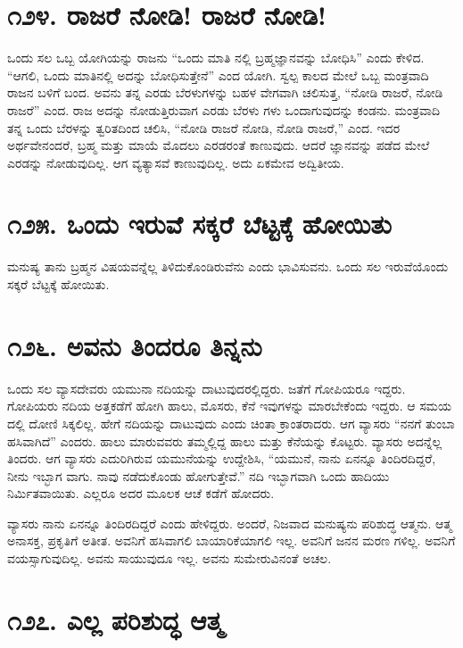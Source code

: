 \section{\num{೧೨೪. } ರಾಜರೆ ನೋಡಿ! ರಾಜರೆ ನೋಡಿ!}

ಒಂದು ಸಲ ಒಬ್ಬ ಯೋಗಿಯನ್ನು ರಾಜನು “ಒಂದು ಮಾತಿ ನಲ್ಲಿ ಬ್ರಹ್ಮಜ್ಞಾನವನ್ನು ಬೋಧಿಸಿ” ಎಂದು ಕೇಳಿದ. “ಆಗಲಿ, ಒಂದು ಮಾತಿನಲ್ಲಿ ಅದನ್ನು ಬೋಧಿಸುತ್ತೇನೆ” ಎಂದ ಯೋಗಿ. ಸ್ವಲ್ಪ ಕಾಲದ ಮೇಲೆ ಒಬ್ಬ ಮಂತ್ರವಾದಿ ರಾಜನ ಬಳಿಗೆ ಬಂದ. ಅವನು ತನ್ನ ಎರಡು ಬೆರಳುಗಳನ್ನು ಬಹಳ ವೇಗವಾಗಿ ಚಲಿಸುತ್ತ, “ನೋಡಿ ರಾಜರೆ, ನೋಡಿ ರಾಜರೆ” ಎಂದ. ರಾಜ ಅದನ್ನು ನೋಡುತ್ತಿರುವಾಗ ಎರಡು ಬೆರಳು ಗಳು ಒಂದಾಗುವುದನ್ನು ಕಂಡನು. ಮಂತ್ರವಾದಿ ತನ್ನ ಒಂದು ಬೆರಳನ್ನು ತ್ವರಿತದಿಂದ ಚಲಿಸಿ, “ನೋಡಿ ರಾಜರೆ ನೋಡಿ, ನೋಡಿ ರಾಜರೆ,” ಎಂದ. ಇದರ ಅರ್ಥವೇನಂದರೆ, ಬ್ರಹ್ಮ ಮತ್ತು ಮಾಯೆ ಮೊದಲು ಎರಡರಂತೆ ಕಾಣುವುದು. ಆದರೆ ಜ್ಞಾನವನ್ನು ಪಡೆದ ಮೇಲೆ ಎರಡನ್ನು ನೋಡುವುದಿಲ್ಲ. ಆಗ ವ್ಯತ್ಯಾಸವೆ ಕಾಣುವುದಿಲ್ಲ. ಅದು ಏಕಮೇವ ಅದ್ವಿತೀಯ.


\section{\num{೧೨೫. } ಒಂದು ಇರುವೆ ಸಕ್ಕರೆ ಬೆಟ್ಟಕ್ಕೆ ಹೋಯಿತು}

ಮನುಷ್ಯ ತಾನು ಬ್ರಹ್ಮನ ವಿಷಯವನ್ನೆಲ್ಲ ತಿಳಿದುಕೊಂಡಿರುವೆನು ಎಂದು ಭಾವಿಸುವನು. ಒಂದು ಸಲ ಇರುವೆಯೊಂದು ಸಕ್ಕರೆ ಬೆಟ್ಟಕ್ಕೆ ಹೋಯಿತು.



\section{\num{೧೨೬. } ಅವನು ತಿಂದರೂ ತಿನ್ನನು}

ಒಂದು ಸಲ ವ್ಯಾಸದೇವರು ಯಮುನಾ ನದಿಯನ್ನು ದಾಟುವುದರಲ್ಲಿದ್ದರು. ಜತೆಗೆ ಗೋಪಿಯರೂ ಇದ್ದರು. ಗೋಪಿಯರು ನದಿಯ ಅತ್ತಕಡೆಗೆ ಹೋಗಿ ಹಾಲು, ಮೊಸರು, ಕೆನೆ ಇವುಗಳನ್ನು ಮಾರಬೇಕೆಂದು ಇದ್ದರು. ಆ ಸಮಯ ದಲ್ಲಿ ದೋಣಿ ಸಿಕ್ಕಲಿಲ್ಲ. ಹೇಗೆ ನದಿಯನ್ನು ದಾಟುವುದು ಎಂದು ಚಿಂತಾ ಕ್ರಾಂತರಾದರು. ಆಗ ವ್ಯಾಸರು “ನನಗೆ ತುಂಬಾ ಹಸಿವಾಗಿದೆ” ಎಂದರು. ಹಾಲು ಮಾರುವವರು ತಮ್ಮಲ್ಲಿದ್ದ ಹಾಲು ಮತ್ತು ಕೆನೆಯನ್ನು ಕೊಟ್ಟರು. ವ್ಯಾಸರು ಅದನ್ನೆಲ್ಲ ತಿಂದರು. ಆಗ ವ್ಯಾಸರು ಎದುರಿಗಿರುವ ಯಮುನೆಯನ್ನು ಉದ್ದೇಶಿಸಿ, “ಯಮುನೆ, ನಾನು ಏನನ್ನೂ ತಿಂದಿರದಿದ್ದರೆ, ನೀನು ಇಬ್ಭಾಗ ವಾಗು. ನಾವು ನಡೆದುಕೊಂಡು ಹೋಗುತ್ತೇವೆ.” ನದಿ ಇಬ್ಭಾಗವಾಗಿ ಒಂದು ಹಾದಿಯು ನಿರ್ಮಿತವಾಯಿತು. ಎಲ್ಲರೂ ಅದರ ಮೂಲಕ ಆಚೆ ಕಡೆಗೆ ಹೋದರು.

ವ್ಯಾಸರು ನಾನು ಏನನ್ನೂ ತಿಂದಿರದಿದ್ದರೆ ಎಂದು ಹೇಳಿದ್ದರು. ಅಂದರೆ, ನಿಜವಾದ ಮನುಷ್ಯನು ಪರಿಶುದ್ಧ ಆತ್ಮನು. ಆತ್ಮ ಅನಾಸಕ್ತ, ಪ್ರಕೃತಿಗೆ ಅತೀತ. ಅವನಿಗೆ ಹಸಿವಾಗಲಿ ಬಾಯಾರಿಕೆಯಾಗಲಿ ಇಲ್ಲ. ಅವನಿಗೆ ಜನನ ಮರಣ ಗಳಿಲ್ಲ. ಅವನಿಗೆ ವಯಸ್ಸಾಗುವುದಿಲ್ಲ. ಅವನು ಸಾಯುವುದೂ ಇಲ್ಲ. ಅವನು ಸುಮೇರುವಿನಂತೆ ಅಚಲ.


\section{\num{೧೨೭. } ಎಲ್ಲ ಪರಿಶುದ್ಧ ಆತ್ಮ}

